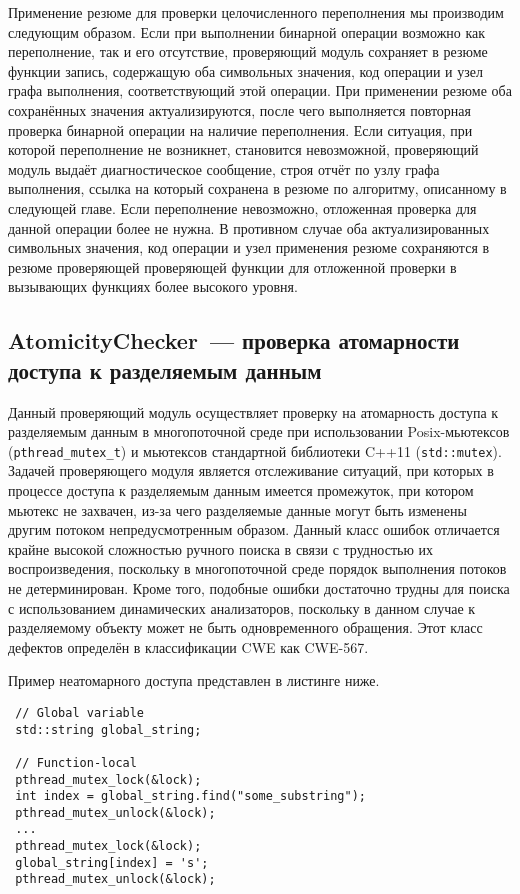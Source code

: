 Применение резюме для проверки целочисленного переполнения мы производим следующим образом. Если при выполнении бинарной операции возможно как переполнение, так и его отсутствие, проверяющий модуль сохраняет в резюме функции запись, содержащую оба символьных значения, код операции и узел графа выполнения, соответствующий этой операции. При применении резюме оба сохранённых значения актуализируются, после чего выполняется повторная проверка бинарной операции на наличие переполнения. Если ситуация, при которой переполнение не возникнет, становится невозможной, проверяющий модуль выдаёт диагностическое сообщение, строя отчёт по узлу графа выполнения, ссылка на который сохранена в резюме по алгоритму, описанному в следующей главе. Если переполнение невозможно, отложенная проверка для данной операции более не нужна. В противном случае оба актуализированных символьных значения, код операции и узел применения резюме сохраняются в резюме проверяющей проверяющей функции для отложенной проверки в вызывающих функциях более высокого уровня.

\subsection{AtomicityChecker~--- проверка атомарности доступа к разделяемым данным} \label{sect:atomicity}

Данный проверяющий модуль осуществляет проверку на атомарность доступа к разделяемым данным в многопоточной среде при использовании Posix-мьютексов (\texttt{pthread\_mutex\_t}) и мьютексов стандартной библиотеки C++11 (\texttt{std::mutex}). Задачей проверяющего модуля является отслеживание ситуаций, при которых в процессе доступа к разделяемым данным имеется промежуток, при котором мьютекс не захвачен, из-за чего разделяемые данные могут быть изменены другим потоком непредусмотренным образом. Данный класс ошибок отличается крайне высокой сложностью ручного поиска в связи с трудностью их воспроизведения, поскольку в многопоточной среде порядок выполнения потоков не детерминирован. Кроме того, подобные ошибки достаточно трудны для поиска с использованием динамических анализаторов, поскольку в данном случае к разделяемому объекту может не быть одновременного обращения. Этот класс дефектов определён в классификации CWE как CWE-567.

Пример неатомарного доступа представлен в листинге ниже.

\begin{verbatim}
 // Global variable
 std::string global_string;
 
 // Function-local
 pthread_mutex_lock(&lock);
 int index = global_string.find("some_substring");
 pthread_mutex_unlock(&lock);
 ...
 pthread_mutex_lock(&lock);
 global_string[index] = 's';
 pthread_mutex_unlock(&lock);
\end{verbatim}

